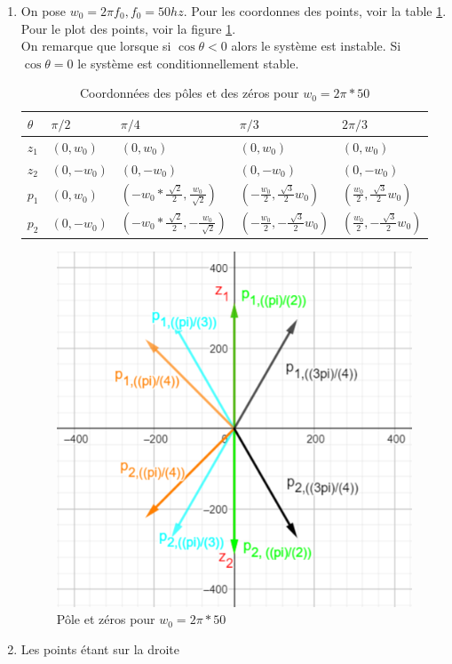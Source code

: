 \documentclass{article}
\theoremstyle{plain}%
\theoremstyle{definition}
\theoremstyle{remark}
\begin{document}
\begin{enumerate}
    \item On pose $ w_0 = 2 \pi f_0, f_0 = 50hz $. Pour les coordonnes des points, voir la table \ref*{pt}. Pour le plot des points, voir la figure \ref{plot_pt}.\\
    On remarque que lorsque si $ \cos \theta  < 0 $ alors le système est instable. Si $ \cos \theta =0 $ le système est conditionnellement stable.
    \begin{table}[!ht]
        \centering
        \begin{tabular}{|l|l|l|l|l|}
        \hline
            $\theta$ & $\pi/2$ & $\pi/4$                                                & $\pi/3$                                           & $ 2\pi /3 $   \\ \hline
            $z_1$ & $(0,w_0)$   & $(0,w_0)$                                             & $(0,w_0)$                                         & $(0,w_0)$     \\ \hline
            $z_2$ & $(0, -w_0)$ & $(0, -w_0)$                                           & $(0, -w_0)$                                       & $(0, -w_0)$   \\ \hline
            $p_1$ & $(0, w_0)$  & $(-w_0*\frac{\sqrt[]{2}}{2}, \frac{w_0}{\sqrt[]{2}})$  & $(-\frac{w_0}{2}, \frac{\sqrt[]{3}}{2}w_0)$      & $(\frac{w_0}{2}, \frac{\sqrt[]{3}}{2}w_0)$ \\ \hline
            $p_2$ & $(0, -w_0)$ & $(-w_0*\frac{\sqrt[]{2}}{2}, -\frac{w_0}{\sqrt[]{2}})$  & $(-\frac{w_0}{2}, -\frac{\sqrt[]{3}}{2}w_0)$    & $(\frac{w_0}{2}, -\frac{\sqrt[]{3}}{2}w_0)$ \\ \hline
        \end{tabular}
        \caption{Coordonnées des pôles et des zéros pour $ w_0 = 2 \pi * 50 $}
        \label{pt}
    \end{table}
    \begin{figure}[htbp]
        \centering
        \includegraphics*[width=.75\textwidth]{./pole_zero.png}
        \caption{Pôle et zéros pour $ w_0 = 2 \pi * 50 $ }
        \label{plot_pt}
    \end{figure}


    \item Les points étant sur la droite 
\end{enumerate}
\end{document}
